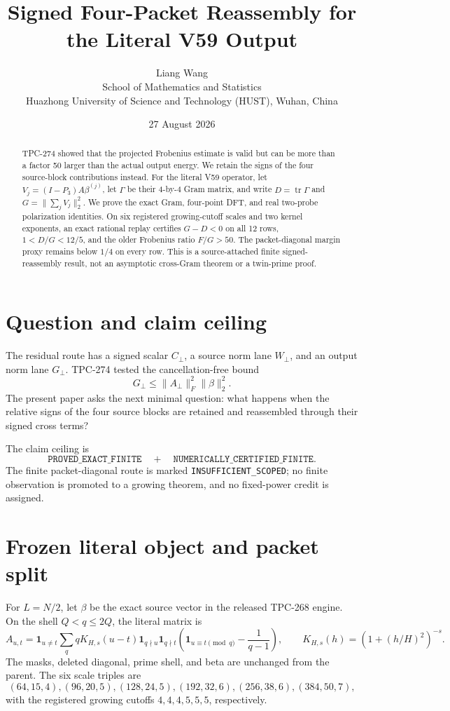 \documentclass[11pt]{article}
\title{Signed Four-Packet Reassembly for the Literal V59 Output}
\author{Liang Wang\\
School of Mathematics and Statistics\\
Huazhong University of Science and Technology (HUST), Wuhan, China}
\date{27 August 2026}
\newcommand{\Aperp}{A_{\perp}}
\newcommand{\Gperp}{G_{\perp}}
\newcommand{\Cperp}{C_{\perp}}
\newcommand{\Wperp}{W_{\perp}}
\begin{document}
\maketitle

\begin{abstract}
TPC-274 showed that the projected Frobenius estimate is valid but can be more
than a factor 50 larger than the actual output energy.  We retain the signs of
the four source-block contributions instead.  For the literal V59 operator,
let \(V_j=(I-P_3)A\beta^{(j)}\), let \(\Gamma\) be their 4-by-4 Gram matrix,
and write \(D=\operatorname{tr}\Gamma\) and
\(G=\|\sum_jV_j\|_2^2\).  We prove the exact Gram, four-point DFT, and real
two-probe polarization identities.  On six registered growing-cutoff scales
and two kernel exponents, an exact rational replay certifies \(G-D<0\) on all
12 rows, \(1<D/G<12/5\), and the older Frobenius ratio \(F/G>50\).  The
packet-diagonal margin proxy remains below \(1/4\) on every row.  This is a
source-attached finite signed-reassembly result, not an asymptotic
cross-Gram theorem or a twin-prime proof.
\end{abstract}

\section{Question and claim ceiling}

The residual route has a signed scalar \(\Cperp\), a source norm lane
\(\Wperp\), and an output norm lane \(\Gperp\).  TPC-274 tested the
cancellation-free bound
\[
 \Gperp\leq \|\Aperp\|_F^2\|\beta\|_2^2.
\]
The present paper asks the next minimal question: what happens when the
relative signs of the four source blocks are retained and reassembled through
their signed cross terms?

The claim ceiling is
\[
 \texttt{PROVED\_EXACT\_FINITE}\quad+\quad
 \texttt{NUMERICALLY\_CERTIFIED\_FINITE}.
\]
The finite packet-diagonal route is marked
\texttt{INSUFFICIENT\_SCOPED}; no finite observation is promoted to a growing
theorem, and no fixed-power credit is assigned.

\section{Frozen literal object and packet split}

For \(L=N/2\), let \(\beta\) be the exact source vector in the released
TPC-268 engine.  On the shell \(Q<q\leq 2Q\), the literal matrix is
\[
 A_{u,t}=\mathbf 1_{u\ne t}\sum_q qK_{H,s}(u-t)
 \mathbf 1_{q\nmid u}\mathbf 1_{q\nmid t}
 \left(\mathbf 1_{u\equiv t\pmod q}-\frac1{q-1}\right),
 \qquad K_{H,s}(h)=\left(1+(h/H)^2\right)^{-s}.
\]
The masks, deleted diagonal, prime shell, and beta are unchanged from the
parent.  The six scale triples are
\[
 (64,15,4),(96,20,5),(128,24,5),
 (192,32,6),(256,38,6),(384,50,7),
\]
with the registered growing cutoffs \(4,4,4,5,5,5\), respectively.
\end{document}
